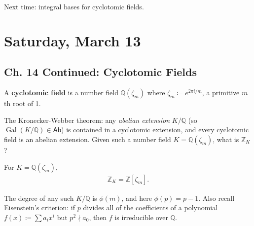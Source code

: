 \begin{remark}

Next time: integral bases for cyclotomic fields.

\end{remark}

\hypertarget{saturday-march-13-1}{%
\section{Saturday, March 13}\label{saturday-march-13-1}}

\hypertarget{ch.-14-continued-cyclotomic-fields}{%
\subsection{Ch. 14 Continued: Cyclotomic
Fields}\label{ch.-14-continued-cyclotomic-fields}}

\begin{definition}

A \textbf{cyclotomic field} is a number field \({\mathbb{Q}}( \zeta_m)\)
where \(\zeta_m \coloneqq e^{2\pi i / m}\), a primitive \(m\)th root of
1.

\end{definition}

\begin{remark}

The Kronecker-Webber theorem: any \emph{abelian extension}
\(K/{\mathbb{Q}}\) (so
\(\operatorname{Gal}(K/{\mathbb{Q}}) \in {\mathsf{Ab}}\)) is contained
in a cyclotomic extension, and every cyclotomic field is an abelian
extension. Given such a number field \(K = {\mathbb{Q}}( \zeta_m)\),
what is \({\mathbb{Z}}_K\)?

\end{remark}

\begin{theorem}

For \(K = {\mathbb{Q}}( \zeta_m)\),
\begin{align*}
{\mathbb{Z}}_K = {\mathbb{Z}}[ \zeta_m ]
.\end{align*}

\end{theorem}

\begin{remark}

The degree of any such \(K/{\mathbb{Q}}\) is \(\phi(m)\), and here
\(\phi(p) = p-1\). Also recall Eisenstein's criterion: if \(p\) divides
all of the coefficients of a polynomial \(f(x) \coloneqq\sum a_i x^i\)
but \(p^2\nmid a_0\), then \(f\) is irreducible over \({\mathbb{Q}}\).

\end{remark}

